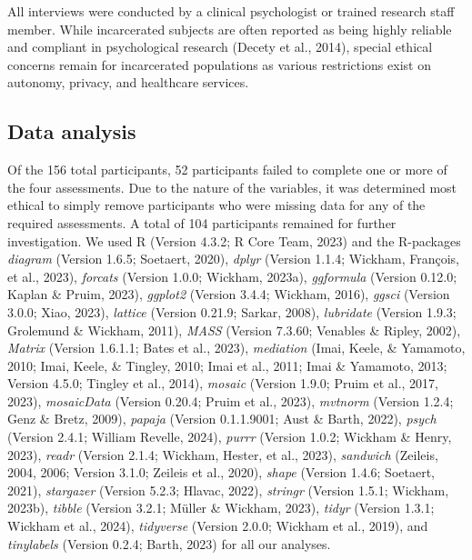 \documentclass[
  man,floatsintext]{apa7}
\begin{document}
All interviews were conducted by a clinical psychologist or trained research staff member. While incarcerated subjects are often reported as being highly reliable and compliant in psychological research (Decety et al., 2014), special ethical concerns remain for incarcerated populations as various restrictions exist on autonomy, privacy, and healthcare services.

\hypertarget{data-analysis}{%
\subsection{Data analysis}\label{data-analysis}}

Of the 156 total participants, 52 participants failed to complete one or more of the four assessments. Due to the nature of the variables, it was determined most ethical to simply remove participants who were missing data for any of the required assessments. A total of 104 participants remained for further investigation. We used R (Version 4.3.2; R Core Team, 2023) and the R-packages \emph{diagram} (Version 1.6.5; Soetaert, 2020), \emph{dplyr} (Version 1.1.4; Wickham, François, et al., 2023), \emph{forcats} (Version 1.0.0; Wickham, 2023a), \emph{ggformula} (Version 0.12.0; Kaplan \& Pruim, 2023), \emph{ggplot2} (Version 3.4.4; Wickham, 2016), \emph{ggsci} (Version 3.0.0; Xiao, 2023), \emph{lattice} (Version 0.21.9; Sarkar, 2008), \emph{lubridate} (Version 1.9.3; Grolemund \& Wickham, 2011), \emph{MASS} (Version 7.3.60; Venables \& Ripley, 2002), \emph{Matrix} (Version 1.6.1.1; Bates et al., 2023), \emph{mediation} (Imai, Keele, \& Yamamoto, 2010; Imai, Keele, \& Tingley, 2010; Imai et al., 2011; Imai \& Yamamoto, 2013; Version 4.5.0; Tingley et al., 2014), \emph{mosaic} (Version 1.9.0; Pruim et al., 2017, 2023), \emph{mosaicData} (Version 0.20.4; Pruim et al., 2023), \emph{mvtnorm} (Version 1.2.4; Genz \& Bretz, 2009), \emph{papaja} (Version 0.1.1.9001; Aust \& Barth, 2022), \emph{psych} (Version 2.4.1; William Revelle, 2024), \emph{purrr} (Version 1.0.2; Wickham \& Henry, 2023), \emph{readr} (Version 2.1.4; Wickham, Hester, et al., 2023), \emph{sandwich} (Zeileis, 2004, 2006; Version 3.1.0; Zeileis et al., 2020), \emph{shape} (Version 1.4.6; Soetaert, 2021), \emph{stargazer} (Version 5.2.3; Hlavac, 2022), \emph{stringr} (Version 1.5.1; Wickham, 2023b), \emph{tibble} (Version 3.2.1; Müller \& Wickham, 2023), \emph{tidyr} (Version 1.3.1; Wickham et al., 2024), \emph{tidyverse} (Version 2.0.0; Wickham et al., 2019), and \emph{tinylabels} (Version 0.2.4; Barth, 2023) for all our analyses.
\end{document}
